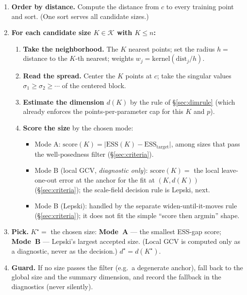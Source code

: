 \documentclass[11pt]{article}
\begin{document}
\begin{enumerate}[leftmargin=1.5em]
\item \textbf{Order by distance.} Compute the distance from $c$ to every training
point and sort. (One sort serves all candidate sizes.)
\item \textbf{For each candidate size $K\in\mathcal{K}$ with $K\le n$:}
  \begin{enumerate}[leftmargin=1.4em,label=(\alph*)]
  \item \textbf{Take the neighborhood.} The $K$ nearest points; set the radius
  $h=$ distance to the $K$-th nearest; weights $w_j=\text{kernel}(\text{dist}_j/h)$.
  \item \textbf{Read the spread.} Center the $K$ points at $c$; take the singular
  values $\sigma_1\ge\sigma_2\ge\cdots$ of the centered block.
  \item \textbf{Estimate the dimension $d(K)$} by the rule of \S\ref{sec:dimrule}
  (which already enforces the points-per-parameter cap for this $K$ and $p$).
  \item \textbf{Score the size} by the chosen mode:
    \begin{itemize}[leftmargin=1.2em]
    \item Mode A: $\text{score}(K)=\big|\mathrm{ESS}(K)-\mathrm{ESS}_{\text{target}}\big|$,
    among sizes that pass the well-posedness filter (\S\ref{sec:criteria}).
    \item Mode B (local GCV, \emph{diagnostic only}): $\text{score}(K)=$ the local
    leave-one-out error at the anchor for the fit at $(K,d(K))$ (\S\ref{sec:criteria});
    the scale-field decision rule is Lepski, next.
    \item Mode B (Lepski): handled by the separate widen-until-it-moves rule
    (\S\ref{sec:criteria}); it does not fit the simple ``score then argmin'' shape.
    \end{itemize}
  \end{enumerate}
\item \textbf{Pick.} $K^\star=$ the chosen size: \textbf{Mode~A} --- the smallest ESS-gap
score; \textbf{Mode~B} --- Lepski's largest accepted size. (Local GCV is computed only as a
diagnostic, never as the decision.) $d^\star=d(K^\star)$.
\item \textbf{Guard.} If no size passes the filter (e.g.\ a degenerate anchor),
fall back to the global size and the summary dimension, and record the fallback in
the diagnostics (never silently).
\end{enumerate}
\end{document}
